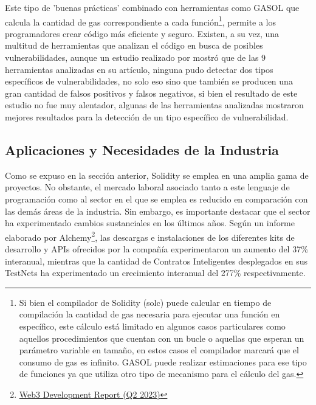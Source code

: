 \documentclass[a4paper,10pt]{article}
\begin{document}
	Este tipo de 'buenas prácticas' combinado con herramientas como GASOL \parencite{albert2020gasol} que calcula la cantidad de gas correspondiente a cada función\footnote{Si bien el compilador de Solidity (solc) puede calcular en tiempo de compilación la cantidad de gas necesaria para ejecutar una función en específico, este cálculo está limitado en algunos casos particulares como aquellos procedimientos que cuentan con un bucle o aquellas que esperan un parámetro variable en tamaño, en estos casos el compilador marcará que el consumo de gas es infinito. GASOL puede realizar estimaciones para ese tipo de funciones ya que utiliza otro tipo de mecanismo para el cálculo del gas.}, permite a los programadores crear código más eficiente y seguro. Existen, a su vez, una multitud de herramientas que analizan el código en busca de posibles vulnerabilidades, aunque un estudio realizado por \textcite{durieux2020empirical} mostró que de las 9 herramientas analizadas en su artículo, ninguna pudo detectar dos tipos específicos de vulnerabilidades, no solo eso sino que también se producen una gran cantidad de falsos positivos y falsos negativos, si bien el resultado de este estudio no fue muy alentador, algunas de las herramientas analizadas mostraron mejores resultados para la detección de un tipo específico de vulnerabilidad.
	\subsection{Aplicaciones y Necesidades de la Industria}
	Como se expuso en la sección anterior, Solidity se emplea en una amplia gama de proyectos. No obstante, el mercado laboral asociado tanto a este lenguaje de programación como al sector en el que se emplea es reducido en comparación con las demás áreas de la industria. Sin embargo, es importante destacar que el sector ha experimentado cambios sustanciales en los últimos años. Según un informe elaborado por Alchemy\footnote{\href{https://www.alchemy.com/blog/web3-developer-report-q2-2023}{Web3 Development Report (Q2 2023)}}, las descargas e instalaciones de los diferentes kits de desarrollo y APIs ofrecidos por la compañía experimentaron un aumento del 37\% interanual, mientras que la cantidad de Contratos Inteligentes desplegados en sus TestNets ha experimentado un crecimiento interanual del 277\% respectivamente.
	
\end{document}
